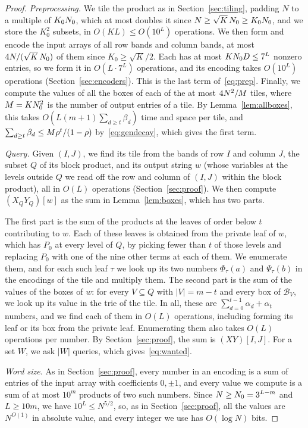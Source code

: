\begin{proof}
\emph{Preprocessing.} We tile the product as in Section~\ref{sec:tiling}, padding $N$ to a multiple of $K_0N_0$, which at most doubles it since $N\ge\sqrt K\,N_0\ge K_0N_0$, and we store the $K_0^2$ subsets, in $O(KL)\le O(10^L)$ operations. We then form and encode the input arrays of all row bands and column bands, at most $4N/(\sqrt K\,N_0)$ of them since $K_0\ge\sqrt K/2$. Each has at most $KN_0 D\le7^L$ nonzero entries, so we form it in $O(L\cdot7^L)$ operations, and its encoding takes $O(10^L)$ operations (Section~\ref{sec:encoders}). This is the last term of~\eqref{eq:prep}. Finally, we compute the values of all the boxes of each of the at most $4N^2/M$ tiles, where $M=KN_0^2$ is the number of output entries of a tile. By Lemma~\ref{lem:allboxes}, this takes $O(L(m+1)\sum_{d\ge t}\beta_d)$ time and space per tile, and $\sum_{d\ge t}\beta_d\le M\rho^t/(1-\rho)$ by~\eqref{eq:gendecay}, which gives the first term.

\emph{Query.} Given $(I,J)$, we find its tile from the bands of row $I$ and column $J$, the subset $Q$ of its block product, and its output string $w$ (whose variables at the levels outside $Q$ we read off the row and column of $(I,J)$ within the block product), all in $O(L)$ operations (Section~\ref{sec:proof}). We then compute $(X_QY_Q)[w]$ as the sum in Lemma~\ref{lem:boxes}, which has two parts.

The first part is the sum of the products at the leaves of order below $t$ contributing to $w$. Each of these leaves is obtained from the private leaf of $w$, which has $P_0$ at every level of $Q$, by picking fewer than $t$ of those levels and replacing $P_0$ with one of the nine other terms at each of them. We enumerate them, and for each such leaf $\tau$ we look up its two numbers $\Phi_\tau(a)$ and $\Psi_\tau(b)$ in the encodings of the tile and multiply them. The second part is the sum of the values of the boxes of $w$: for every $V\subseteq Q$ with $|V|=m-t$ and every box of $\mathcal B_V$, we look up its value in the trie of the tile. In all, these are $\sum_{d=0}^{t-1}\alpha_d+\alpha_t$ numbers, and we find each of them in $O(L)$ operations, including forming its leaf or its box from the private leaf. Enumerating them also takes $O(L)$ operations per number. By Section~\ref{sec:proof}, the sum is $(XY)[I,J]$. For a set $W$, we ask $|W|$ queries, which gives~\eqref{eq:wanted}.

\emph{Word size.} As in Section~\ref{sec:proof}, every number in an encoding is a sum of entries of the input array with coefficients $0,\pm1$, and every value we compute is a sum of at most $10^m$ products of two such numbers. Since $N\ge N_0=3^{L-m}$ and $L\ge10m$, we have $10^L\le N^{5/2}$, so, as in Section~\ref{sec:proof}, all the values are $N^{O(1)}$ in absolute value, and every integer we use has $O(\log N)$ bits.
\end{proof}

